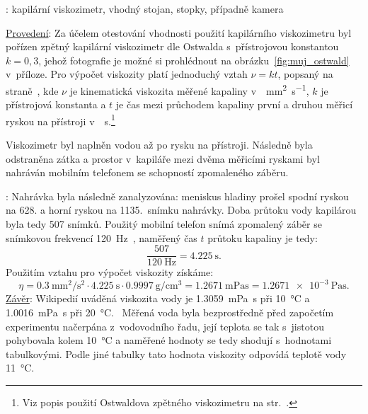 \documentclass[12pt]{article}
\begin{document}
\noindent \underline{}: kapilární viskozimetr, vhodný stojan, stopky, případně kamera
\par
\noindent \underline{Provedení}: Za účelem otestování vhodnosti použití kapilárního viskozimetru byl pořízen zpětný kapilární viskozimetr dle Ostwalda s~přístrojovou konstantou $k = 0,3$, jehož fotografie je možné si prohlédnout na obrázku~\ref{fig:muj_ostwald} v~příloze. Pro výpočet viskozity platí jednoduchý vztah $\nu=kt$, popsaný na straně~\pageref{eq:kapilarni_viskozimetr}, kde $\nu$ je kinematická viskozita měřené kapaliny v~\SI{}{\milli\metre\squared\per\second}, $k$ je přístrojová konstanta a $t$ je čas mezi průchodem kapaliny první a druhou měřicí ryskou na přístroji v~\SI{}{\second}.\footnote{Viz popis použití Ostwaldova zpětného viskozimetru na str.~\pageref{sec:zpetny_ostwald}.}
\par
Viskozimetr byl naplněn vodou až po rysku na přístroji. Následně byla odstraněna zátka a prostor v~kapiláře mezi dvěma měřicími ryskami byl nahráván mobilním telefonem se schopností zpomaleného záběru.
\par
\underline{}: Nahrávka byla následně zanalyzována: meniskus hladiny prošel spodní ryskou na 628. a horní ryskou na 1135.~snímku nahrávky. Doba průtoku vody kapilárou byla tedy 507 snímků. Použitý mobilní telefon snímá zpomalený záběr se snímkovou frekvencí \SI{120}{\hertz}\footnotemark~\cite{rec:Samsung_A40}, naměřený čas $t$ průtoku kapaliny je tedy:
\begin{equation}
    \frac{507}{\SI{120}{\hertz}} = \SI{4,225}{\second}\text{.}
\end{equation}
Použitím vztahu pro výpočet viskozity získáme:~\cite{online:Water_density}
\begin{equation}
    \eta = \SI{0,3}{\milli\metre\squared\per\second\squared}\cdot\SI{4,225}{\second}\cdot\SI{0.9997}{\gram\per\centi\meter\cubed} = \SI{1,2671}{\milli\pascal\second} = \SI{1,2671e-3}{\pascal\second}\text{.}
\end{equation}
\noindent
\underline{Závěr}: Wikipedií uváděná viskozita vody je \SI{1,3059}{\milli\pascal\second} při \SI{10}{\degreeCelsius} a \SI{1,0016}{\milli\pascal\second} při \SI{20}{\degreeCelsius}.~\cite{wiki:Viscosity} Měřená voda byla bezprostředně před započetím experimentu načerpána z~vodovodního řadu, její teplota se tak s~jistotou pohybovala kolem \SI{10}{\degreeCelsius} a naměřené hodnoty se tedy shodují s~hodnotami tabulkovými. Podle jiné tabulky tato hodnota viskozity odpovídá teplotě vody \SI{11}{\degreeCelsius}.~\cite{online:Water_viscosity}
\end{document}

